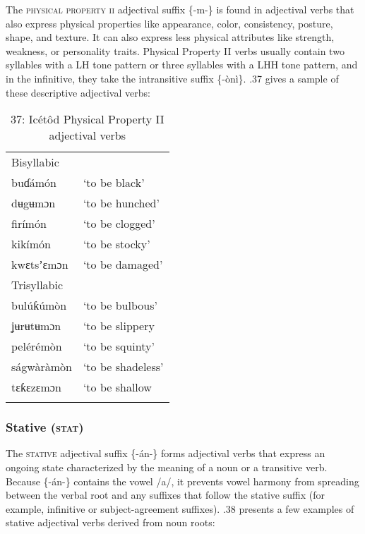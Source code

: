The \textsc{physical property ii} adjectival suffix \{-m-\} is found in adjectival verbs that also express physical properties like appearance, color, consistency, posture, shape, and texture. It can also express less physical attributes like strength, weakness, or personality traits. Physical Property II verbs usually contain two syllables with a LH tone pattern or three syllables with a LHH tone pattern, and in the infinitive, they take the intransitive suffix \{-ònì\}. .37 gives a sample of these descriptive adjectival verbs:


\begin{table}
\caption{37: Icétôd Physical Property II adjectival verbs}
\label{tab:8}


\begin{tabularx}{\textwidth}{XX}
\lsptoprule

Bisyllabic & \\
buɗámón & ‘to be black’\\
dʉgʉmɔn & ‘to be hunched’\\
firímón & ‘to be clogged’\\
kikímón & ‘to be stocky’\\
kwɛtsʼɛmɔn & ‘to be damaged’\\
Trisyllabic & \\
bulúƙúmòn & ‘to be bulbous’\\
ʝʉrʉtʉmɔn & ‘to be slippery\\
pelérémòn & ‘to be squinty’\\
ságwàràmòn & ‘to be shadeless’\\
tɛƙɛzɛmɔn & ‘to be shallow\\
\lspbottomrule
\end{tabularx}
\end{table}

\subsubsection{Stative (\textsc{stat})}

The \textsc{stative} adjectival suffix \{-án-\} forms adjectival verbs that express an ongoing state characterized by the meaning of a noun or a transitive verb. Because \{-án-\} contains the vowel /a/, it prevents vowel harmony from spreading between the verbal root and any suffixes that follow the stative suffix (for example, infinitive or subject-agreement suffixes). .38 presents a few examples of stative adjectival verbs derived from noun roots:


